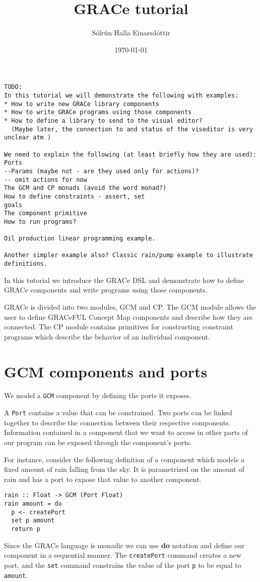 \documentclass[a4paper,11pt]{article}
\title{GRACe tutorial}
\author{Sólrún Halla Einarsdóttir}
\date{\today}
\begin{document}
\maketitle
\begin{verbatim}
TODO:
In this tutorial we will demonstrate the following with examples:
* How to write new GRACe library components
* How to write GRACe programs using those components
* How to define a library to send to the visual editor?
  (Maybe later, the connection to and status of the viseditor is very unclear atm )

We need to explain the following (at least briefly how they are used):
Ports
--Params (maybe not - are they used only for actions)?
-- omit actions for now
The GCM and CP monads (avoid the word monad?)
How to define constraints - assert, set
goals
The component primitive
How to run programs?

Oil production linear programming example.

Another simpler example also? Classic rain/pump example to illustrate 
definitions.
\end{verbatim}
In this tutorial we introduce the GRACe DSL and demonstrate how to define
GRACe components and write programs using those components.

GRACe is divided into two modules, GCM and CP. The GCM module allows the user
to define GRACeFUL Concept Map components and describe how they are connected.
The CP module contains primitives for constructing constraint programs which
describe the behavior of an individual component.

\section{GCM components and ports}
We model a \texttt{GCM} component by defining the ports it exposes.

A \texttt{Port} contains a value that can be constrained.
Two ports can be linked together to describe the connection between their
respective components.
Information contained in a component that we want to access in other parts
of our program can be exposed through the component's ports.

For instance, consider the following definition of a component which models
a fixed amount of rain falling from the sky.
It is parametrized on the amount of rain and has a port to expose that value
to another component.
\begin{verbatim}
rain :: Float -> GCM (Port Float)
rain amount = do
  p <- createPort
  set p amount
  return p
\end{verbatim}
Since the GRACe language is monadic we can use \textbf{do} notation and define our
component in a sequential manner.
The \texttt{createPort} command creates a new port, and the \texttt{set} command
constrains the value of the port \texttt{p} to be equal to \texttt{amount}.
\end{document}
